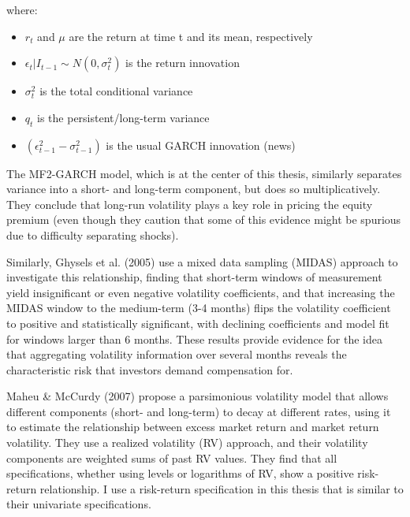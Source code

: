 \documentclass[12pt]{article}
\begin{document}
\noindent where:
\begin{itemize}
\item $r_t$ and $\mu$ are the return at time t and its mean, respectively
\item $\epsilon_t | I_{t-1} \sim N(0,\sigma_t^2)$ is the return innovation
\item $\sigma_t^2$ is the total conditional variance
\item $q_t$ is the persistent/long-term variance
\item $(\epsilon_{t-1}^2-\sigma_{t-1}^2)$ is the usual GARCH innovation (news)
\end{itemize}
The MF2-GARCH model, which is at the center of this thesis, similarly separates variance into a short- and long-term component, but does so multiplicatively. They conclude that long-run volatility plays a key role in pricing the equity premium (even though they caution that some of this evidence might be spurious due to difficulty separating shocks).\par
Similarly, Ghysels et al. (2005) use a mixed data sampling (MIDAS) approach to investigate this relationship, finding that short-term windows of measurement yield insignificant or even negative volatility coefficients, and that increasing the MIDAS window to the medium-term (3-4 months) flips the volatility coefficient to positive and statistically significant, with declining coefficients and model fit for windows larger than 6 months. These results provide evidence for the idea that aggregating volatility information over several months reveals the characteristic risk that investors demand compensation for.\par
Maheu \& McCurdy (2007) propose a parsimonious volatility model that allows different components (short- and long-term) to decay at different rates, using it to estimate the relationship between excess market return and market return volatility. They use a realized volatility (RV) approach, and their volatility components are weighted sums of past RV values. They find that all specifications, whether using levels or logarithms of RV,  show a positive risk-return relationship. I use a risk-return specification in this thesis that is similar to their univariate specifications. \par
\end{document}
